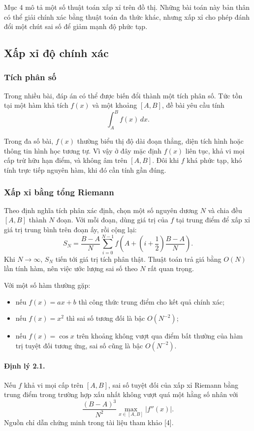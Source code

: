 \documentclass[11pt]{article}
\begin{document}
Mục 4 mô tả một số thuật toán xấp xỉ trên đồ thị. Những bài toán này bản thân
có thể giải chính xác bằng thuật toán đa thức khác, nhưng xấp xỉ cho phép đánh
đổi một chút sai số để giảm mạnh độ phức tạp.

\subsection{Xấp xỉ độ chính xác}

\subsubsection{Tích phân số}

Trong nhiều bài, đáp án có thể được biến đổi thành một tích phân số. Tức tồn
tại một hàm khả tích $f(x)$ và một khoảng $[A,B]$, đề bài yêu cầu tính
\[
  \int_A^B f(x)\,dx.
\]

Trong đa số bài, $f(x)$ thường biểu thị độ dài đoạn thẳng, diện tích hình hoặc
thông tin hình học tương tự. Vì vậy ở đây mặc định $f(x)$ liên tục, khả vi mọi
cấp trừ hữu hạn điểm, và không âm trên $[A,B]$. Đôi khi $f$ khá phức tạp, khó
tính trực tiếp nguyên hàm, khi đó cần tính gần đúng.

\subsubsection{Xấp xỉ bằng tổng Riemann}

Theo định nghĩa tích phân xác định, chọn một số nguyên dương $N$ và chia đều
$[A,B]$ thành $N$ đoạn. Với mỗi đoạn, dùng giá trị của $f$ tại trung điểm để
xấp xỉ giá trị trung bình trên đoạn ấy, rồi cộng lại:
\[
  S_N=\frac{B-A}{N}\sum_{i=0}^{N-1}
  f\!\left(A+\left(i+\frac12\right)\frac{B-A}{N}\right).
\]
Khi $N\to\infty$, $S_N$ tiến tới giá trị tích phân thật. Thuật toán trả giá
bằng $O(N)$ lần tính hàm, nên việc ước lượng sai số theo $N$ rất quan trọng.

Với một số hàm thường gặp:
\begin{itemize}
  \item nếu $f(x)=ax+b$ thì công thức trung điểm cho kết quả chính xác;
  \item nếu $f(x)=x^2$ thì sai số tương đối là bậc $O(N^{-2})$;
  \item nếu $f(x)=\cos x$ trên khoảng không vượt qua điểm bất thường của hàm
  trị tuyệt đối tương ứng, sai số cũng là bậc $O(N^{-2})$.
\end{itemize}

\paragraph{Định lý 2.1.}
Nếu $f$ khả vi mọi cấp trên $[A,B]$, sai số tuyệt đối của xấp xỉ Riemann bằng
trung điểm trong trường hợp xấu nhất không vượt quá một hằng số nhân với
\[
  \frac{(B-A)^3}{N^2}\max_{x\in[A,B]}|f''(x)|.
\]
Nguồn chỉ dẫn chứng minh trong tài liệu tham khảo [4].
\end{document}

